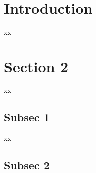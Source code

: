 \documentclass[11pt,a4paper,twoside,titlepage]{article}
\begin{document}
\section{Introduction}

xx

\section{Section 2}
xx
\subsection{Subsec 1 }
xx
\subsection{Subsec 2}
\end{document}
